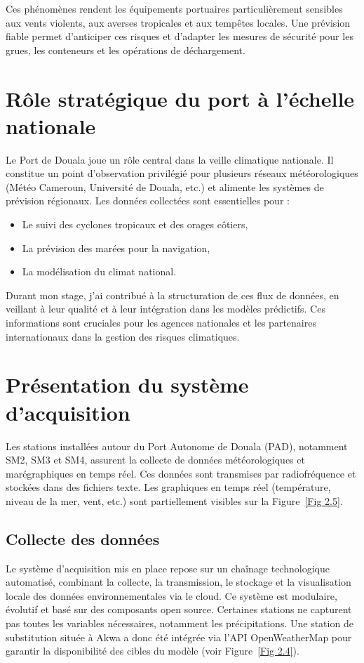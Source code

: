 \documentclass[a4paper,12pt,openany]{report}
\begin{document}
Ces phénomènes rendent les équipements portuaires particulièrement sensibles aux vents violents, aux averses tropicales et aux tempêtes locales. Une prévision fiable permet d’anticiper ces risques et d’adapter les mesures de sécurité pour les grues, les conteneurs et les opérations de déchargement.

\section{Rôle stratégique du port à l’échelle nationale}

Le Port de Douala joue un rôle central dans la veille climatique nationale. Il constitue un point d’observation privilégié pour plusieurs réseaux météorologiques (Météo Cameroun, Université de Douala, etc.) et alimente les systèmes de prévision régionaux. Les données collectées sont essentielles pour :
\begin{itemize}
	\item Le suivi des cyclones tropicaux et des orages côtiers,
	\item La prévision des marées pour la navigation,
	\item La modélisation du climat national.
\end{itemize}

Durant mon stage, j’ai contribué à la structuration de ces flux de données, en veillant à leur qualité et à leur intégration dans les modèles prédictifs. Ces informations sont cruciales pour les agences nationales et les partenaires internationaux dans la gestion des risques climatiques.


\section{Présentation du système d’acquisition}

\quad Les stations installées autour du Port Autonome de Douala (PAD), notamment SM2, SM3 et SM4, assurent la collecte de données météorologiques et marégraphiques en temps réel. Ces données sont transmises par radiofréquence et stockées dans des fichiers texte. Les graphiques en temps réel (température, niveau de la mer, vent, etc.) sont partiellement visibles sur la Figure~\ref{Fig 2.5}.

\subsection{Collecte des données}

\quad Le système d’acquisition mis en place repose sur un chaînage technologique automatisé, combinant la collecte, la transmission, le stockage et la visualisation locale des données environnementales via le cloud. Ce système est modulaire, évolutif et basé sur des composants open source. Certaines stations ne capturent pas toutes les variables nécessaires, notamment les précipitations. Une station de substitution située à Akwa a donc été intégrée via l’API OpenWeatherMap pour garantir la disponibilité des cibles du modèle (voir Figure~\ref{Fig 2.4}).
\end{document}
